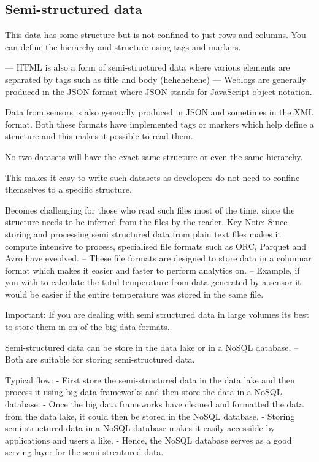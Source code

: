 \documentclass[a4paper, 11pt]{article}
\begin{document}
    \subsection{Semi-structured data}
    This data has some structure but is not confined to just rows and columns.
    You can define the hierarchy and structure using tags and markers.

    --- HTML is also a form of semi-structured data where various elements are separated by tags such as title and body (hehehehehe)
    --- Weblogs are generally produced in the JSON format where JSON stands for JavaScript object notation.

    Data from sensors is also generally produced in JSON and sometimes in the XML format.
    Both these formats have implemented tags or markers which help define a structure and this makes it possible to read them.

    No two datasets will have the exact same structure or even the same hierarchy.

    This makes it easy to write such datasets as developers do not need to confine themselves to a specific structure.

    Becomes challenging for those who read such files most of the time, since the structure needs to be inferred from the files by the reader.
    Key Note: Since storing and processing semi structured data from plain text files makes it compute intensive to process, specialised file formats such as ORC, Parquet and Avro have eveolved.
    -- These file formats are designed to store data in a columnar format which makes it easier and faster to perform analytics on.
    -- Example, if you with to calculate the total temperature from data generated by a sensor it would be easier if the entire temperature was stored in the same file.

    Important: If you are dealing with semi structured data in large volumes its best to store them in on of the big data formats.

    Semi-structured data can be store in the data lake or in a NoSQL database.
    -- Both are suitable for storing semi-structured data.

    Typical flow:
    - First store the semi-structured data in the data lake and then process it using big data frameworks and then store the data in a NoSQL database.
    - Once the big data frameworks have cleaned and formatted the data from the data lake, it could then be stored in the NoSQL database.
    - Storing semi-structured data in a NoSQL database makes it easily accessible by applications and users a like.
    - Hence, the NoSQL database serves as a good serving layer for the semi strcutured data.
\end{document}
